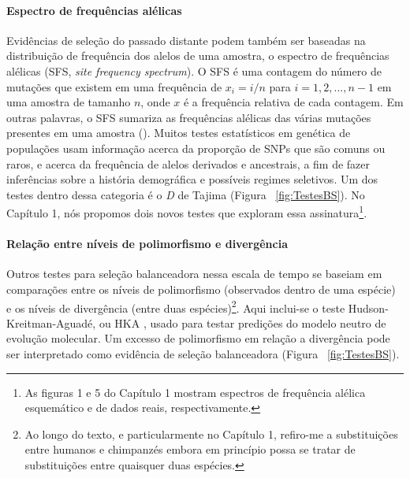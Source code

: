 \begin{refsection}
\paragraph{Espectro de frequências alélicas} 
Evidências de seleção do passado distante podem também ser baseadas na distribuição de frequência dos alelos de uma amostra, o espectro de frequências alélicas (SFS, \emph{site frequency spectrum}). O SFS é uma contagem do número de mutações que existem em uma frequência de $x_{i}=i/n$ para $i=1,2,...,n-1$ em uma amostra de tamanho $n$, onde $x$ é a frequência relativa de cada contagem. Em outras palavras, o SFS sumariza as frequências alélicas das várias mutações presentes em uma amostra (\cite{Nielsen2005}). Muitos testes estatísticos em genética de populações usam informação acerca da proporção de SNPs que são comuns ou raros, e acerca da frequência de alelos derivados e ancestrais, a fim de fazer inferências sobre a história demográfica e possíveis regimes seletivos. Um dos testes dentro dessa categoria é o \emph{D} de Tajima \parencite{tajima1989statistical,Mitchell-Olds2007} (Figura ~\ref{fig:TestesBS}). No Capítulo 1, nós propomos dois novos testes que exploram essa assinatura\footnote{As figuras 1 e 5 do Capítulo 1 mostram espectros de frequência alélica esquemático e de dados reais, respectivamente.}.




\paragraph{Relação entre níveis de polimorfismo e divergência\label{topico:poldiv}} 
Outros testes para seleção balanceadora nessa escala de tempo se baseiam em comparações entre os níveis de polimorfismo (observados dentro de uma espécie) e os níveis de divergência (entre duas espécies)\footnote{Ao longo do texto, e particularmente no Capítulo 1, refiro-me a substituições entre humanos e chimpanzés embora em princípio possa se tratar de substituições entre quaisquer duas espécies.}. Aqui inclui-se o teste Hudson-Kreitman-Aguadé, ou HKA \parencite{Hudson1987}, usado para testar predições do modelo neutro de evolução molecular. Um excesso de polimorfismo em relação a divergência pode ser interpretado como evidência de seleção balanceadora (Figura ~\ref{fig:TestesBS}).


\end{refsection}
